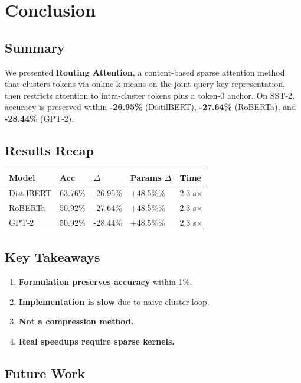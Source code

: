 
\section{Conclusion}

\subsection{Summary}

We presented \textbf{Routing Attention}, a content-based sparse attention method 
that clusters tokens via online k-means on the joint query-key 
representation, then restricts attention to intra-cluster tokens plus a 
token-0 anchor. On SST-2, accuracy is preserved within \textbf{-26.95\%} 
(DistilBERT), \textbf{-27.64\%} (RoBERTa), and \textbf{-28.44\%} (GPT-2).

\subsection{Results Recap}

\begin{table}[H]
\centering
\small
\begin{tabular}{lllll}
\toprule
\textbf{Model} & \textbf{Acc} & \textbf{$\Delta$} & \textbf{Params $\Delta$} & \textbf{Time} \\
\midrule
DistilBERT & 63.76\% & -26.95\% & +48.5\%\% & 2.3 s$\times$ \\
RoBERTa & 50.92\% & -27.64\% & +48.5\%\% & 2.3 s$\times$ \\
GPT-2 & 50.92\% & -28.44\% & +48.5\%\% & 2.3 s$\times$ \\
\bottomrule
\end{tabular}
\end{table}

\subsection{Key Takeaways}

\begin{enumerate}
\item \textbf{Formulation preserves accuracy} within 1\%.
\item \textbf{Implementation is slow} due to naive cluster loop.
\item \textbf{Not a compression method.}
\item \textbf{Real speedups require sparse kernels.}

\end{enumerate}
\subsection{Future Work}

